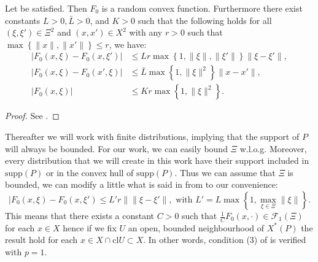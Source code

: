 \documentclass{amsart}
\begin{document}
\begin{proposition}\label{prop 2}
    Let  be satisfied. Then $F_0$ is a random convex function. Furthermore there exist constants $L>0, \bar{L}>0$, and $K>0$ such that the following holds for all $\left(\xi,\xi'\right)\in\Xi^2$ and $\left(x,x'\right)\in X^2$ with any $r>0$ such that $\max\left\{\lVert x\rVert, \lVert x' \rVert\right\}\leq r$, we have:
    \begin{align}
        \lvert F_0\left(x,\xi\right)- F_0\left(x,\xi'\right)\rvert &\leq Lr\max\left\{1,\lVert \xi\rVert, \lVert \xi'\rVert\right\}\lVert \xi-\xi'\rVert, \label{lips}\\
        \lvert F_0\left(x,\xi\right)- F_0\left(x',\xi\right)\rvert &\leq \bar{L}\max\left\{1,\lVert\xi\rVert^2\right\}\lVert x-x'\rVert, \nonumber \\
        \lvert F_0\left(x,\xi\right) \rvert&\leq Kr\max\left\{1,\lVert\xi\rVert^2\right\} \nonumber.
    \end{align}
     
\end{proposition}
\begin{proof}
    See \cite[Proposition 22]{romisch_stability_2003}.
\end{proof}
Thereafter we will work with finite distributions, implying that the support of $P$ will always be bounded. For our work, we can easily bound $\Xi$ w.l.o.g. Moreover, every distribution that we will create in this work have their support included in $\text{supp}\left(P\right)$ or in the convex hull of $\text{supp}\left(P\right)$. Thus we can assume that $\Xi$ is bounded, we can modify a little what is said in  from  to our convenience:
$$
\lvert F_0\left(x,\xi\right)- F_0\left(x,\xi'\right) \leq L'r \lVert \lVert \xi-\xi'\rVert, \text{ with } L'=L\max\left\{1,\max_{\xi\in\Xi}\lVert\xi\rVert\right\}.
$$
This means that there exists a constant $C>0$ such that $\frac{1}{C}F_0\left(x,\cdot\right)\in\mathcal{F}_1\left(\Xi\right)$ for each $x\in X$ hence if we fix $U$ an open, bounded neighbourhood of $X^*\left(P\right)$ the result hold for each $x\in X\cap \text{cl}U\subset X$. In other words, condition (3) of  is verified with $p=1$.
\end{document}
